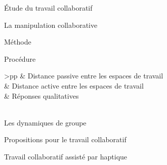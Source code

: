 \documentclass[myfrancais]{mythesis}
\begin{document}
\begin{mypart}{Étude du travail collaboratif}
\begin{mychapter}{La manipulation collaborative}
\begin{mysection}{Méthode}
\begin{mysubsection}{Procédure}
\begin{mytable}
\begin{mytabular}{>{\bfseries}p{\exptwofirstcolumn}p{\exptwosecondcolumn}}
							                                          &  Distance passive entre les espaces de travail                        \\
							                                          &  Distance active entre les espaces de travail                         \\
							                                          &  Réponses qualitatives                                                \\
							\mymiddlerule[\heavyrulewidth]
							 \\
							\mybottomrule
						\end{mytabular}
					\end{mytable}
				\end{mysubsection}
			\end{mysection}
		\end{mychapter}
		\begin{mychapter}{Les dynamiques de groupe}
		\end{mychapter}
	\end{mypart}
	\begin{mypart}{Propositions pour le travail collaboratif}
		\begin{mychapter}{Travail collaboratif assisté par haptique}
		\end{mychapter}
	\end{mypart}
\end{document}
